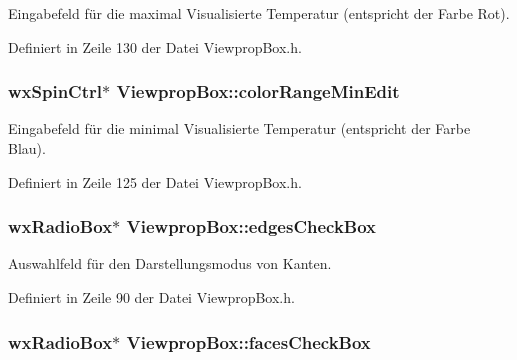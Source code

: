Eingabefeld für die maximal Visualisierte Temperatur (entspricht der Farbe Rot). 



Definiert in Zeile 130 der Datei Viewprop\-Box.\-h.

\hypertarget{classViewpropBox_a64af7732726775603579fedcf231d5e0}{
\subsubsection[{color\-Range\-Min\-Edit}]{\setlength{\rightskip}{0pt plus 5cm}wx\-Spin\-Ctrl$\ast$ Viewprop\-Box\-::color\-Range\-Min\-Edit\hspace{0.3cm}{\ttfamily [private]}}}\label{classViewpropBox_a64af7732726775603579fedcf231d5e0}


Eingabefeld für die minimal Visualisierte Temperatur (entspricht der Farbe Blau). 



Definiert in Zeile 125 der Datei Viewprop\-Box.\-h.

\hypertarget{classViewpropBox_a42925abd6e515ec8f12e9de662edf39e}{
\subsubsection[{edges\-Check\-Box}]{\setlength{\rightskip}{0pt plus 5cm}wx\-Radio\-Box$\ast$ Viewprop\-Box\-::edges\-Check\-Box\hspace{0.3cm}{\ttfamily [private]}}}\label{classViewpropBox_a42925abd6e515ec8f12e9de662edf39e}


Auswahlfeld für den Darstellungsmodus von Kanten. 



Definiert in Zeile 90 der Datei Viewprop\-Box.\-h.

\hypertarget{classViewpropBox_ad5b2d4c590f1594ae5b0c80251d80005}{
\subsubsection[{faces\-Check\-Box}]{\setlength{\rightskip}{0pt plus 5cm}wx\-Radio\-Box$\ast$ Viewprop\-Box\-::faces\-Check\-Box\hspace{0.3cm}{\ttfamily [private]}}}\label{classViewpropBox_ad5b2d4c590f1594ae5b0c80251d80005}


